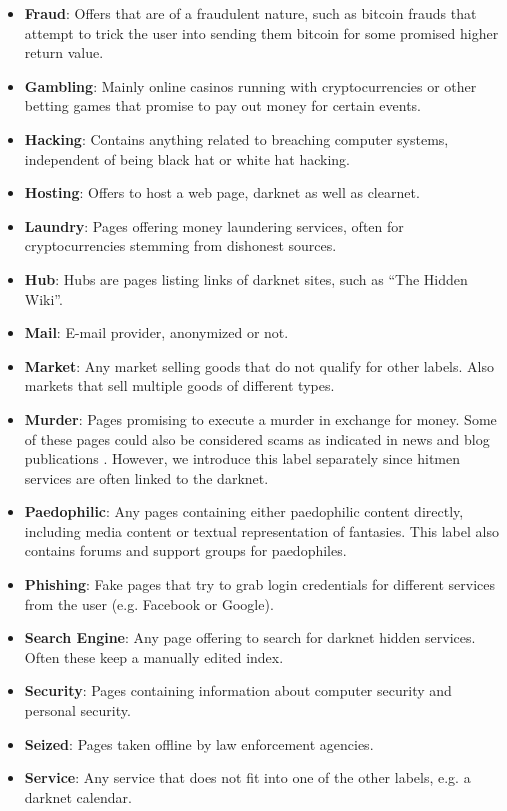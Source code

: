 \documentclass[USenglish,oneside,twocolumn]{article}
\begin{document}
\begin{itemize}
	\item \textbf{Fraud}: Offers that are of a fraudulent nature, such as bitcoin frauds that attempt to trick the user into sending them bitcoin for some promised higher return value.
	\item \textbf{Gambling}: Mainly online casinos running with cryptocurrencies or other betting games that promise to pay out money for certain events.
	\item \textbf{Hacking}: Contains anything related to breaching computer systems, independent of being black hat or white hat hacking.
	\item \textbf{Hosting}: Offers to host a web page, darknet as well as clearnet.
	\item \textbf{Laundry}: Pages offering money laundering services, often for cryptocurrencies stemming from dishonest sources.
	\item \textbf{Hub}: Hubs are pages listing links of darknet sites, such as ``The Hidden Wiki''.
	\item \textbf{Mail}: E-mail provider, anonymized or not.
	\item \textbf{Market}: Any market selling goods that do not qualify for other labels. Also markets that sell multiple goods of different types.
	\item \textbf{Murder}: Pages promising to execute a murder in exchange for money. Some of these pages could also be considered scams as indicated in news and blog publications \cite{Monteiro}. However, we introduce this label separately since hitmen services are often linked to the darknet.
	\item \textbf{Paedophilic}: Any pages containing either paedophilic content directly, including media content or textual representation of fantasies. This label also contains forums and support groups for paedophiles.
	\item \textbf{Phishing}: Fake pages that try to grab login credentials for different services from the user (e.g. Facebook or Google).
	\item \textbf{Search Engine}: Any page offering to search for darknet hidden services. Often these keep a manually edited index.
	\item \textbf{Security}: Pages containing information about computer security and personal security.
	\item \textbf{Seized}: Pages taken offline by law enforcement agencies.
	\item \textbf{Service}: Any service that does not fit into one of the other labels, e.g. a darknet calendar.

\end{itemize}
\end{document}
